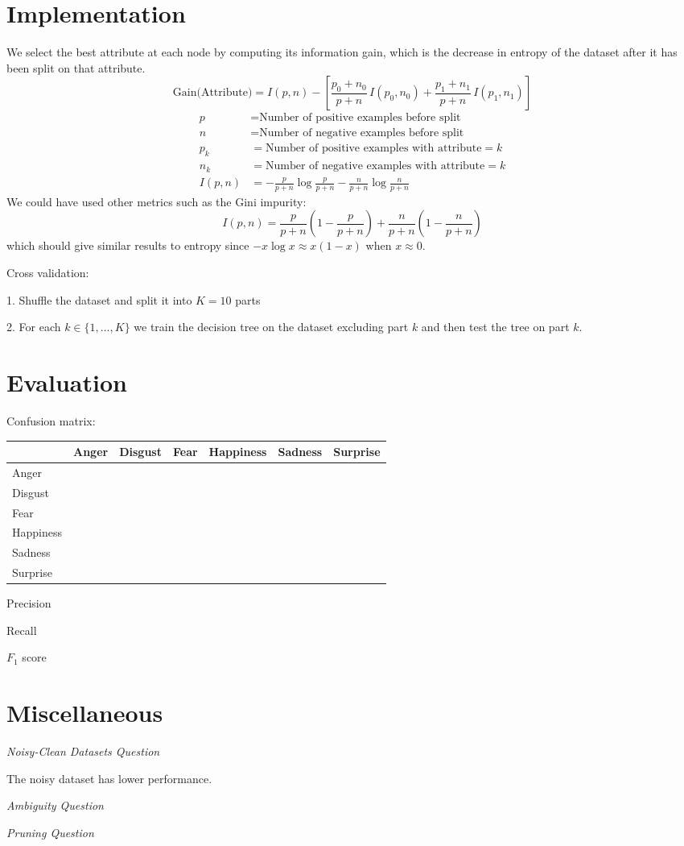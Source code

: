 \documentclass[12pt, a4paper, portrait]{article}
\begin{document}
\section*{Implementation}
We select the best attribute at each node by computing its information gain, which is the decrease in entropy of the dataset after it has been split on that attribute.
\[ \text{Gain(Attribute)} = I(p, n) - \left[ \frac{p_0 + n_0}{p + n} \, I(p_0, n_0) + \frac{p_1 + n_1}{p + n} \, I(p_1, n_1) \right] \]
\begin{align*}
    p &= \text{Number of positive examples before split} \\
    n &= \text{Number of negative examples before split} \\
    p_k &= \text{Number of positive examples with attribute} = k \\
    n_k &= \text{Number of negative examples with attribute} = k \\
    I(p, n) &= - \frac{p}{p+n} \log \frac{p}{p+n} - \frac{n}{p+n} \log \frac{n}{p+n}
\end{align*}
We could have used other metrics such as the Gini impurity:
\[ I(p, n) = \frac{p}{p+n} \left( 1 - \frac{p}{p+n} \right) + \frac{n}{p+n} \left( 1 - \frac{n}{p+n} \right) \]
which should give similar results to entropy since $-x \log x \approx x (1-x)$ when $x \approx 0$.\par
\bigskip
Cross validation:\par
1. Shuffle the dataset and split it into $K = 10$ parts\par
2. For each $k \in \{1, \dots, K\}$ we train the decision tree on the dataset excluding part $k$ and then test the tree on part $k$.

\section*{Evaluation}
Confusion matrix:
\begin{center}
\begin{tabular} { C{1.7cm} | C{1.5cm} C{1.5cm} C{1.3cm} C{1.7cm} C{1.5cm} C{1.5cm} }
    & Anger & Disgust & Fear & Happiness & Sadness & Surprise \\ \hline
    Anger     &   &   &   &   &   &   \\
    Disgust   &   &   &   &   &   &   \\
    Fear      &   &   &   &   &   &   \\
    Happiness &   &   &   &   &   &   \\
    Sadness	  &   &   &   &   &   &   \\
    Surprise  &   &   &   &   &   &
\end{tabular}
\end{center}
Precision\par
Recall\par
$F_1$ score\par

\section*{Miscellaneous}

\textit{Noisy-Clean Datasets Question}\par
\bigskip
The noisy dataset has lower performance.\par
\bigskip

\textit{Ambiguity Question}\par
\bigskip

\textit{Pruning Question}\par
\bigskip
\end{document}
